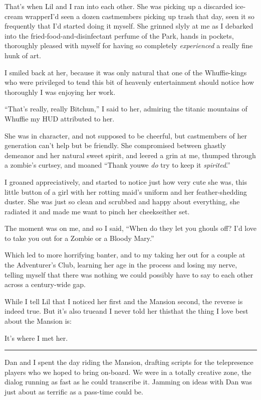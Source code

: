 That's when Lil and I ran into each other. She was picking up a
discarded ice-cream wrapper{\dash}I'd seen a dozen castmembers picking up
trash that day, seen it so frequently that I'd started doing it
myself. She grinned slyly at me as I debarked into the
fried-food-and-disinfectant perfume of the Park, hands in pockets,
thoroughly pleased with myself for having so completely
\emph{experienced} a really fine hunk of art.

I smiled back at her, because it was only natural that one of the
Whuffie-kings who were privileged to tend this bit of heavenly
entertainment should notice how thoroughly I was enjoying her
work.

“That's really, really Bitchun,” I said to her, admiring the
titanic mountains of Whuffie my HUD attributed to her.

She was in character, and not supposed to be cheerful, but
castmembers of her generation can't help but be friendly. She
compromised between ghastly demeanor and her natural sweet spirit,
and leered a grin at me, thumped through a zombie's curtsey, and
moaned “Thank you{\dash}we \emph{do} try to keep it \emph{spirited}.”

I groaned appreciatively, and started to notice just how very cute
she was, this little button of a girl with her rotting maid's
uniform and her feather-shedding duster. She was just so clean and
scrubbed and happy about everything, she radiated it and made me
want to pinch her cheeks{\dash}either set.

The moment was on me, and so I said, “When do they let you ghouls
off? I'd love to take you out for a Zombie or a Bloody Mary.”

Which led to more horrifying banter, and to my taking her out for a
couple at the Adventurer's Club, learning her age in the process
and losing my nerve, telling myself that there was nothing we could
possibly have to say to each other across a century-wide gap.

While I tell Lil that I noticed her first and the Mansion second,
the reverse is indeed true. But it's also true{\dash}and I never told her
this{\dash}that the thing I love best about the Mansion is:

It's where I met her.

\begin{center}\rule{3in}{0.4pt}\end{center}

Dan and I spent the day riding the Mansion, drafting scripts for
the telepresence players who we hoped to bring on-board. We were in
a totally creative zone, the dialog running as fast as he could
transcribe it. Jamming on ideas with Dan was just about as terrific
as a pass-time could be.

